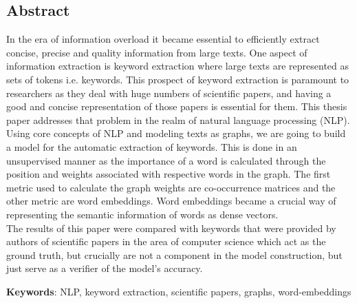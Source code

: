 \documentclass[12pt]{article}
\numberwithin{equation}{section}
\begin{document}
	\begin{spacing}{1.5}
	\section*{Abstract}
	In the era of information overload it became essential to efficiently extract concise, precise and quality information from large texts. One aspect of information extraction is keyword extraction where large texts are represented as sets of tokens i.e. keywords. This prospect of keyword extraction is paramount to researchers as they deal with huge numbers of scientific papers, and having a good and concise representation of those papers is essential for them. This thesis paper addresses that problem in the realm of natural language processing (NLP). \\
	Using core concepts of NLP and modeling texts as graphs, we are going to build a model for the automatic extraction of keywords. This is done in an unsupervised manner as the importance of a word is calculated through the position and weights associated with respective words in the graph. The first metric used to calculate the graph weights are co-occurrence matrices and the other metric are word embeddings. Word embeddings became a crucial way of representing the semantic information of words as dense vectors. \\
	The results of this paper were compared with keywords that were provided by authors of scientific papers in the area of computer science which act as the ground truth, but crucially are not a component in the model construction, but just serve as a verifier of the model's accuracy.
	
	\textbf{Keywords}: NLP, keyword extraction, scientific papers, graphs, word-embeddings
	
	\newpage
	\pagestyle{empty}
	\tableofcontents
	\setcounter{page}{0}
	\newpage
	\listoffigures
	\setcounter{page}{0}
	\pagebreak
	
	
	\newpage
	\pagestyle{fancy}

\end{spacing}
\end{document}
